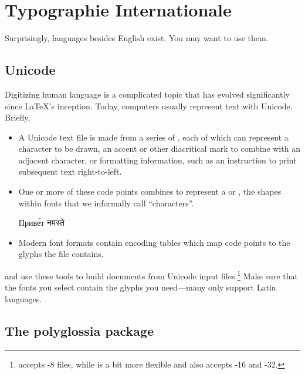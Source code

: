 \chapter{Typographie Internationale}
\label{i18n}

Surprisingly, languages besides English exist.
You may want to use them.

\section{Unicode}

Digitizing human language is a complicated topic that has evolved significantly
since \LaTeX's inception.
Today, computers usually represent text with Unicode. Briefly,
\begin{itemize}
\item A Unicode text file is made from a series of ,
    each of which can represent a character to be drawn,
    an accent or other diacritical mark to combine with an adjacent
    character,
    or formatting information,
    such as an instruction to print subsequent text right-to-left.
\item One or more of these code points combines to represent a
     or ,
    the shapes within fonts that we informally call ``characters''\quotekern.
\begin{centerfigure}
\large%
%
Приве́т
\quad{}%
नमस्ते
\end{centerfigure}
\item Modern font formats contain encoding tables
    which map code points to the glyphs the file contains.
\end{itemize}
\LuaLaTeX{} and \XeLaTeX{} use these tools to build documents
from Unicode input
files.\punckern\footnote{\LuaLaTeX{} accepts \mbox{-8} files,
while \XeLaTeX{} is a bit more flexible and also
accepts \mbox{-16} and
\mbox{-32}.}
Make sure that the fonts you select contain the glyphs you need---many
only support Latin languages.

\section{The polyglossia package}

